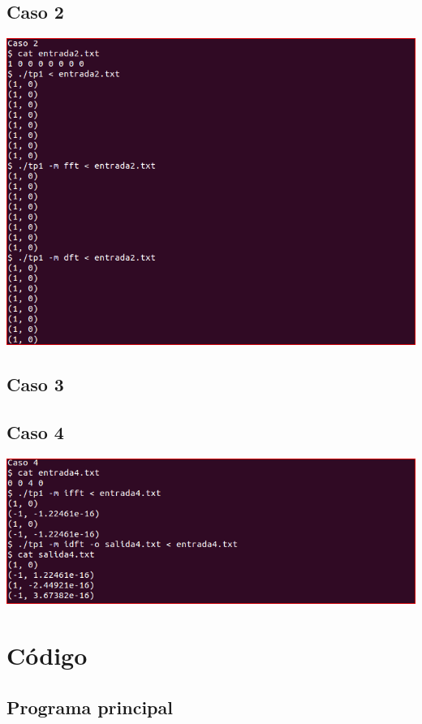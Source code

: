 \documentclass{article}
\begin{document}
  \subsection{Caso 2}
    \begin{center}
      \includegraphics[width=0.8\paperwidth]{Imagenes/caso_2}
    \end{center}
  \subsection{Caso 3}
    
  \subsection{Caso 4}
    \begin{center}
      \includegraphics[width=0.8\paperwidth]{Imagenes/caso_4}
    \end{center}

\section{Código}
  \subsection{Programa principal}
\end{document}
